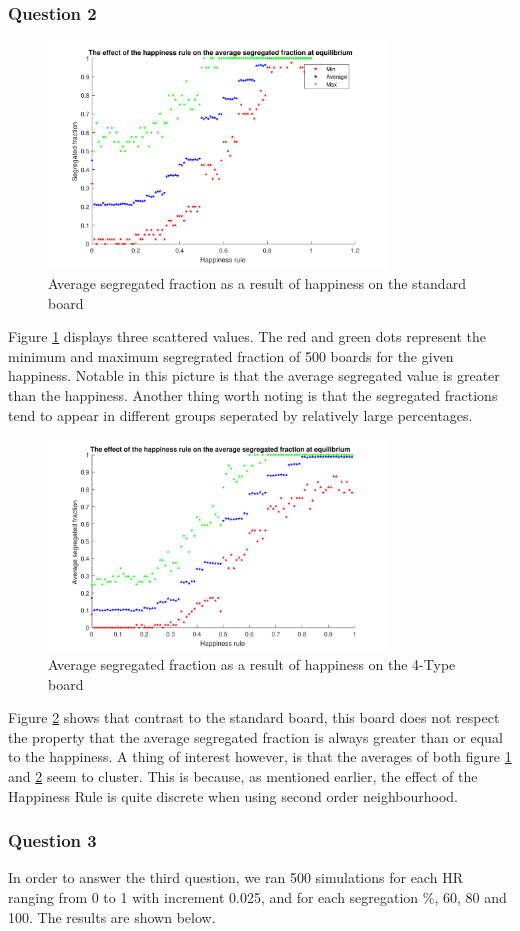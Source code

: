 \subsubsection{Question 2}
\begin{figure}[H]
    \centering
    \includegraphics[width=0.8\textwidth]{habysegfrac_sb_2}
    \caption{Average segregated fraction as a result of happiness on the standard board}
    \label{fig:happysegsb}
\end{figure}

Figure \ref{fig:happysegsb} displays three scattered values. The red and green dots represent the minimum and maximum segregrated fraction of 500 boards for the given happiness. Notable in this picture is that the average segregated value is greater than the happiness. 
Another thing worth noting is that the segregated fractions tend to appear in different groups seperated by relatively large percentages.
\begin{figure}[H]
    \centering
    \includegraphics[width=0.8\textwidth]{habysegfrac_4b_2}
    \caption{Average segregated fraction as a result of happiness on the 4-Type board}
    \label{fig:happyseg4b}
\end{figure}
Figure \ref{fig:happyseg4b} shows that contrast to the standard board, this board does not respect the property that the average segregated fraction is always greater than or equal to the happiness. 
A thing of interest however, is that the averages of both figure \ref{fig:happysegsb} and \ref{fig:happyseg4b} seem to cluster. This is because, as mentioned earlier, the effect of the Happiness Rule is quite discrete when using second order neighbourhood.
\subsubsection{Question 3}
In order to answer the third question, we ran 500 simulations for each HR ranging from 0 to 1 with increment 0.025, and for each segregation $\%$, 60, 80 and 100. The results are shown below.
